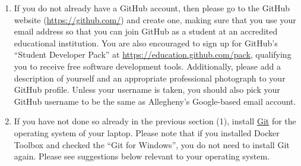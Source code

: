 \begin{enumerate}

  \item If you do not already have a GitHub account, then please go to the GitHub website (\url{https://github.com/}) and create one, making sure
    that you use your  email address so that you can join GitHub as a student at an accredited
    educational institution. You are also encouraged to sign up for GitHub's ``Student Developer Pack'' at
    \url{https://education.github.com/pack}, qualifying you to receive free software development tools. Additionally,
    please add a description of yourself and an appropriate professional photograph to your GitHub profile. Unless your
    username is taken, you should also pick your GitHub username to be the same as Allegheny's Google-based email
    account. 
  
  \item If you have not done so already in the previous section (1), install \href{https://git-scm.com/downloads}{Git} for the operating system of your laptop. Please note that if you installed Docker Toolbox and checked the ``Git for Windows'', you do not need to install Git again. Please see suggestions below relevant to your operating system.
  

\end{enumerate}
